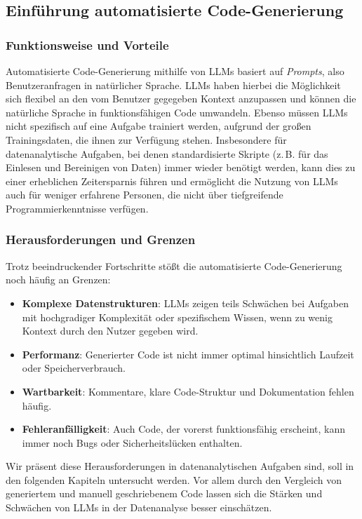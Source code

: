 \documentclass[11pt,a4paper]{article}
\begin{document}
\subsection{Einführung automatisierte Code-Generierung}
\label{sec:AutoCode}

\subsubsection{Funktionsweise und Vorteile}
Automatisierte Code-Generierung mithilfe von LLMs basiert auf \emph{Prompts}, also Benutzeranfragen in natürlicher Sprache. LLMs haben hierbei die Möglichkeit sich flexibel an den vom Benutzer gegegeben Kontext anzupassen und können die natürliche Sprache in funktionsfähigen Code umwandeln. Ebenso müssen LLMs nicht spezifisch auf eine Aufgabe trainiert werden, aufgrund der großen Trainingsdaten, die ihnen zur Verfügung stehen\cite{chen2021evaluatinglargelanguagemodels}. Insbesondere für datenanalytische Aufgaben, bei denen standardisierte Skripte (z.\,B. für das Einlesen und Bereinigen von Daten) immer wieder benötigt werden, kann dies zu einer erheblichen Zeitersparnis führen und ermöglicht die Nutzung von LLMs auch für weniger erfahrene Personen, die nicht über tiefgreifende Programmierkenntnisse verfügen.

\subsubsection{Herausforderungen und Grenzen}
Trotz beeindruckender Fortschritte stößt die automatisierte Code-Generierung noch häufig an Grenzen\cite{nijkamp2023codegenopenlargelanguage,wang2021codet5identifierawareunifiedpretrained}:
\begin{itemize}
    \item \textbf{Komplexe Datenstrukturen}: LLMs zeigen teils Schwächen bei Aufgaben mit hochgradiger Komplexität oder spezifischem Wissen, wenn zu wenig Kontext durch den Nutzer gegeben wird\cite{nijkamp2023codegenopenlargelanguage,wang2021codet5identifierawareunifiedpretrained}.
    \item \textbf{Performanz}: Generierter Code ist nicht immer optimal hinsichtlich Laufzeit oder Speicherverbrauch\cite{wang2021codet5identifierawareunifiedpretrained}.
    \item \textbf{Wartbarkeit}: Kommentare, klare Code-Struktur und Dokumentation fehlen häufig.
    \item \textbf{Fehleranfälligkeit}: Auch Code, der vorerst funktionsfähig erscheint, kann immer noch Bugs oder Sicherheitslücken enthalten.
\end{itemize}
Wir präsent diese Herausforderungen in datenanalytischen Aufgaben sind, soll in den folgenden Kapiteln untersucht werden. Vor allem durch den Vergleich von generiertem und manuell geschriebenem Code lassen sich die Stärken und Schwächen von LLMs in der Datenanalyse besser einschätzen.
\end{document}
